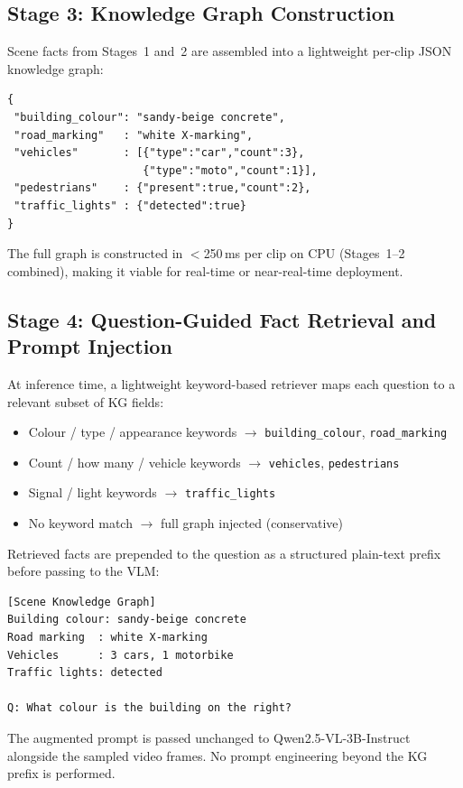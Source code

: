 \documentclass[10pt,conference,compsoc]{IEEEtran}
\begin{document}
\subsection{Stage 3: Knowledge Graph Construction}
\label{sec:method:kg}

Scene facts from Stages~1 and~2 are assembled into a
lightweight per-clip JSON knowledge graph:

\begin{verbatim}
{
 "building_colour": "sandy-beige concrete",
 "road_marking"   : "white X-marking",
 "vehicles"       : [{"type":"car","count":3},
                     {"type":"moto","count":1}],
 "pedestrians"    : {"present":true,"count":2},
 "traffic_lights" : {"detected":true}
}
\end{verbatim}

The full graph is constructed in $<$250\,ms per clip on CPU
(Stages~1--2 combined), making it viable for real-time or
near-real-time deployment.

\subsection{Stage 4: Question-Guided Fact Retrieval and Prompt Injection}
\label{sec:method:retrieval}

At inference time, a lightweight keyword-based retriever maps
each question to a relevant subset of KG fields:
\begin{itemize}
  \item Colour / type / appearance keywords $\to$
        \texttt{building\_colour}, \texttt{road\_marking}
  \item Count / how many / vehicle keywords $\to$
        \texttt{vehicles}, \texttt{pedestrians}
  \item Signal / light keywords $\to$ \texttt{traffic\_lights}
  \item No keyword match $\to$ full graph injected (conservative)
\end{itemize}
Retrieved facts are prepended to the question as a structured
plain-text prefix before passing to the VLM:

\begin{verbatim}
[Scene Knowledge Graph]
Building colour: sandy-beige concrete
Road marking  : white X-marking
Vehicles      : 3 cars, 1 motorbike
Traffic lights: detected

Q: What colour is the building on the right?
\end{verbatim}

The augmented prompt is passed unchanged to Qwen2.5-VL-3B-Instruct
alongside the sampled video frames.
No prompt engineering beyond the KG prefix is performed.
\end{document}
